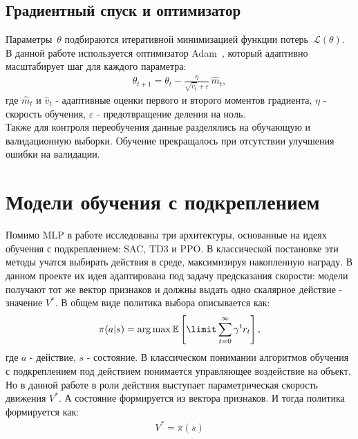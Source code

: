\subsection{Градиентный спуск и оптимизатор}

Параметры~$\theta$ подбираются итеративной минимизацией функции потерь~$\mathcal{L}(\theta)$.
В данной работе используется оптимизатор Adam~\cite{kingma2015adam}, который адаптивно масштабирует шаг для каждого параметра:
\begin{gather}
    \theta_{t+1} = \theta_t - \frac{\eta}{\sqrt{\hat{v}_t} + \varepsilon}\,\hat{m}_t,
\end{gather}
где $\hat{m}_t$ и $\hat{v}_t$ - адаптивные оценки первого и второго моментов градиента, $\eta$ - скорость обучения, $\varepsilon$ - предотвращение деления на ноль.\\
Также для контроля переобучения данные разделялись на обучающую и валидационную выборки.
Обучение прекращалось при отсутствии улучшения ошибки на валидации.



%


\section{Модели обучения с подкреплением}

Помимо MLP в работе исследованы три архитектуры, основанные на идеях обучения с подкреплением: SAC, TD3 и PPO.
В классической постановке эти методы учатся выбирать действия в среде, максимизируя накопленную награду.
В данном проекте их идея адаптирована под задачу предсказания скорости: модели получают тот же вектор признаков и должны выдать одно скалярное действие - значение $V^{\ast}$.
В общем виде политика выбора описывается как:
\begin{gather}
    \pi(a|s) = \arg\max\mathbb E \left[ \limit\sum_{t=0}^{\infty}\gamma^t r_t \right],
\end{gather}
где $a$ - действие, $s$ - состояние.
В классическом понимании алгоритмов обучения с подкреплением под действием понимается управляющее воздействие на объект.
Но в данной работе в роли действия выступает параметрическая скорость движения $V^\ast$.
А состояние формируется из вектора признаков.
И тогда политика формируется как:
\begin{gather}
    V^{\ast} = \pi(s)
\end{gather}

